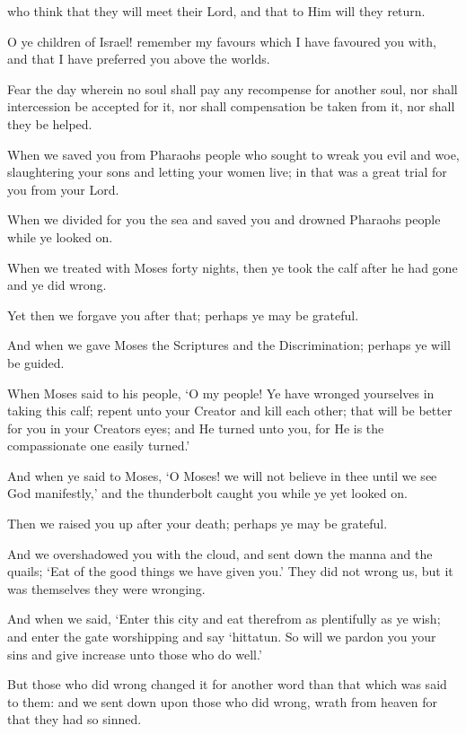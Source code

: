 \documentclass[fontsize=14pt, letterpaper, notitlepage, openany, DIV=12]{scrbook} %
\begin{document}
\noindent[2:46]
who think that they will meet their Lord, and that to Him will they return.

\noindent[2:47]
O ye children of Israel! remember my favours which I have favoured you with, and that I
have preferred you above the worlds.

\noindent[2:48]
Fear the day wherein no soul shall pay any recompense for another soul, nor shall
intercession be accepted for it, nor shall compensation be taken from it, nor shall they be helped.

\noindent[2:49]
When we saved you from Pharaohs people who sought to wreak you evil and woe,
slaughtering your sons and letting your women live; in that was a great trial for you from your
Lord.

\noindent[2:50]
When we divided for you the sea and saved you and drowned Pharaohs people while ye
looked on.

\noindent[2:51]
When we treated with Moses forty nights, then ye took the calf after he had gone and ye
did wrong.

\noindent[2:52]
Yet then we forgave you after that; perhaps ye may be grateful.

\noindent[2:53]
And when we gave Moses the Scriptures and the Discrimination; perhaps ye will be
guided.

\noindent[2:54]
When Moses said to his people, `O my people! Ye have wronged yourselves in taking
this calf; repent unto your Creator and kill each other; that will be better for you in your Creators
eyes; and He turned unto you, for He is the compassionate one easily turned.'

\noindent[2:55]
And when ye said to Moses, `O Moses! we will not believe in thee until we see God
manifestly,' and the thunderbolt caught you while ye yet looked on.

\noindent[2:56]
Then we raised you up after your death; perhaps ye may be grateful.

\noindent[2:57]
And we overshadowed you with the cloud, and sent down the manna and the quails; `Eat
of the good things we have given you.' They did not wrong us, but it was themselves they were
wronging.

\noindent[2:58]
And when we said, `Enter this city and eat therefrom as plentifully as ye wish; and enter
the gate worshipping and say `hittatun. So will we pardon you your sins and give increase unto
those who do well.'

\noindent[2:59]
But those who did wrong changed it for another word than that which was said to them:
and we sent down upon those who did wrong, wrath from heaven for that they had so sinned.
\end{document}
